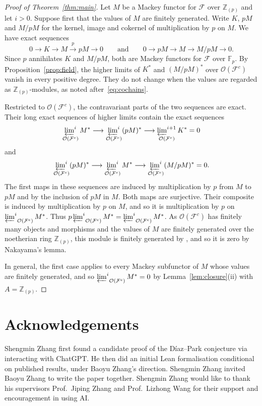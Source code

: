 \documentclass[10pt]{amsart}
\theoremstyle{definition}
\numberwithin{equation}{section}
\newcommand{\F}{\mathcal F}
\newcommand{\Op}{\mathcal O}
\newcommand{\limi}[2]{\mathop{\varprojlim\nolimits^{#1}}_{#2}}
\begin{document}
\begin{proof}[Proof of Theorem~\ref{thm:main}]
Let $M$ be a Mackey functor for $\F$ over $\mathbb{Z}_{(p)}$ and let $i>0$.
Suppose first that the values of $M$ are finitely generated.
Write $K$, $pM$ and $M/pM$ for the kernel, image and cokernel of multiplication by $p$ on $M$. We have exact sequences
\[
0\longrightarrow K\longrightarrow M\xrightarrow{p}pM\longrightarrow0
\qquad\text{and}\qquad
0\longrightarrow pM\longrightarrow M\longrightarrow M/pM\longrightarrow0.
\]
Since $p$ annihilates $K$ and $M/pM$, both are Mackey functors for $\F$ over $\mathbb{F}_p$.
By Proposition~\ref{prop:field}, the higher limits of $K^*$ and $(M/pM)^*$ over $\Op(\F^c)$ vanish in every positive degree.
They do not change when the values are regarded as $\mathbb{Z}_{(p)}$-modules, as noted after~\eqref{eq:cochains}.

Restricted to $\Op(\F^c)$, the contravariant parts of the two sequences are exact.
Their long exact sequences of higher limits contain the exact sequences
\[
\limi{i}{\Op(\F^c)}M^*\longrightarrow\limi{i}{\Op(\F^c)}(pM)^*\longrightarrow\limi{i+1}{\Op(\F^c)}K^*=0
\]
and
\[
\limi{i}{\Op(\F^c)}(pM)^*\longrightarrow\limi{i}{\Op(\F^c)}M^*\longrightarrow\limi{i}{\Op(\F^c)}(M/pM)^*=0.
\]
The first maps in these sequences are induced by multiplication by $p$ from $M$ to $pM$ and by the inclusion of $pM$ in $M$.
Both maps are surjective.
Their composite is induced by multiplication by $p$ on $M$, and so it is multiplication by $p$ on $\limi{i}{\Op(\F^c)}M^*$.
Thus $p\limi{i}{\Op(\F^c)}M^*=\limi{i}{\Op(\F^c)}M^*$.
As $\Op(\F^c)$ has finitely many objects and morphisms and the values of $M$ are finitely generated over the noetherian ring $\mathbb{Z}_{(p)}$, this module is finitely generated by \cite[Proposition~III.5.5(a)]{AKO}, and so it is zero by Nakayama's lemma.

In general, the first case applies to every Mackey subfunctor of $M$ whose values are finitely generated, and so $\limi{i}{\Op(\F^c)}M^*=0$ by Lemma~\ref{lem:closure}(ii) with $A=\mathbb{Z}_{(p)}$.
\end{proof}
\section*{Acknowledgements}
Shengmin Zhang first found a candidate proof of the D\'iaz--Park conjecture via interacting with ChatGPT. He then did an initial Lean formalisation conditional on published results, under Baoyu Zhang's direction. Shengmin Zhang invited Baoyu Zhang to write the paper together. Shengmin Zhang would like to thank his supervisors Prof.~Jiping Zhang and Prof.~Lizhong Wang for their support and encouragement in using AI.
\end{document}
